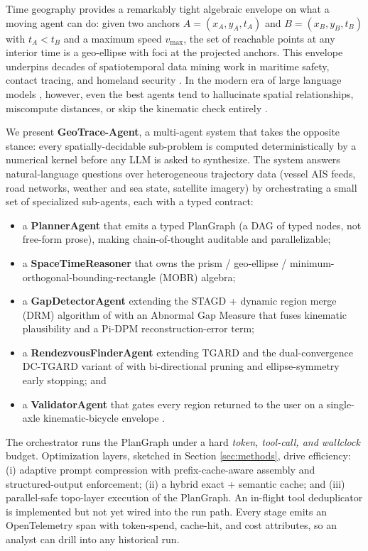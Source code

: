 \documentclass{article}
\begin{document}
Time geography \citep{hagerstrand1970what} provides a remarkably tight algebraic envelope on what a moving agent can do: given two anchors $A=(x_A, y_A, t_A)$ and $B=(x_B, y_B, t_B)$ with $t_A<t_B$ and a maximum speed $v_{\max}$, the set of reachable points at any interior time is a geo-ellipse with foci at the projected anchors. This envelope underpins decades of spatiotemporal data mining work in maritime safety, contact tracing, and homeland security \citep{sharma2022tist, sharma2024tist, sharma2022sigspatial, sharma2025geoanomalies}. In the modern era of large language models \citep{anthropic2024claude, openai2024gpt4}, however, even the best agents tend to hallucinate spatial relationships, miscompute distances, or skip the kinematic check entirely \citep{liu2024llava, chen2024spatialvlm}.

\smallskip
We present \textbf{GeoTrace-Agent}, a multi-agent system that takes the opposite stance: every spatially-decidable sub-problem is computed deterministically by a numerical kernel before any LLM is asked to synthesize. The system answers natural-language questions over heterogeneous trajectory data (vessel AIS feeds, road networks, weather and sea state, satellite imagery) by orchestrating a small set of specialized sub-agents, each with a typed contract:
\begin{itemize}[leftmargin=*]
  \item a \textbf{PlannerAgent} that emits a typed PlanGraph (a DAG of typed nodes, not free-form prose), making chain-of-thought auditable and parallelizable;
  \item a \textbf{SpaceTimeReasoner} that owns the prism / geo-ellipse / minimum-orthogonal-bounding-rectangle (MOBR) algebra;
  \item a \textbf{GapDetectorAgent} extending the STAGD + dynamic region merge (DRM) algorithm of \citet{sharma2024tist} with an Abnormal Gap Measure that fuses kinematic plausibility and a Pi-DPM \citep{sharma2025geoanomalies} reconstruction-error term;
  \item a \textbf{RendezvousFinderAgent} extending TGARD and the dual-convergence DC-TGARD variant of \citet{sharma2022sigspatial} with bi-directional pruning and ellipse-symmetry early stopping; and
  \item a \textbf{ValidatorAgent} that gates every region returned to the user on a single-axle kinematic-bicycle envelope \citep{kong2015kinematic}.
\end{itemize}

\smallskip
The orchestrator runs the PlanGraph under a hard \emph{token, tool-call, and wallclock} budget. Optimization layers, sketched in Section \ref{sec:methods}, drive efficiency: (i) adaptive prompt compression with prefix-cache-aware assembly \citep{anthropic2024promptcache} and structured-output enforcement; (ii) a hybrid exact + semantic cache; and (iii) parallel-safe topo-layer execution of the PlanGraph. An in-flight tool deduplicator is implemented but not yet wired into the run path. Every stage emits an OpenTelemetry span \citep{opentelemetry2024} with token-spend, cache-hit, and cost attributes, so an analyst can drill into any historical run.
\end{document}
